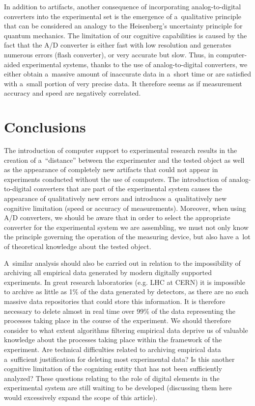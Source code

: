In addition to artifacts, another consequence of incorporating analog-to-digital converters into the experimental set is the emergence of a~qualitative principle that can be considered an analogy to the Heisenberg's uncertainty principle for quantum mechanics. The limitation of our cognitive capabilities is caused by the fact that the A/D converter is either fast with low resolution and generates numerous errors (flash converter), or very accurate but slow. Thus, in computer-aided experimental systems, thanks to the use of analog-to-digital converters, we either obtain a~massive amount of inaccurate data in a~short time or are satisfied with a~small portion of very precise data. It therefore seems as if measurement accuracy and speed are negatively correlated.



\section{Conclusions}

The introduction of computer support to experimental research results in the creation of a~``distance'' between the experimenter and the tested object as well as the appearance of completely new artifacts that could not appear in experiments conducted without the use of computers. The introduction of analog-to-digital converters that are part of the experimental system causes the appearance of qualitatively new errors and introduces a~qualitatively new cognitive limitation (speed or accuracy of measurements). Moreover, when using A/D converters, we should be aware that in order to select the appropriate converter for the experimental system we are assembling, we must not only know the principle governing the operation of the measuring device, but also have a~lot of theoretical knowledge about the tested object.



A~similar analysis should also be carried out in relation to the impossibility of archiving all empirical data generated by modern digitally supported experiments. In great research laboratories (e.g. LHC at CERN) it is impossible to archive as little as 1\% of the data generated by detectors, as there are no such massive data repositories that could store this information. It is therefore necessary to delete almost in real time over 99\% of the data representing the processes taking place in the course of the experiment. We should therefore consider to what extent algorithms filtering empirical data deprive us of valuable knowledge about the processes taking place within the framework of the experiment. Are technical difficulties related to archiving empirical data a~sufficient justification for deleting most experimental data? Is this another cognitive limitation of the cognizing entity that has not been sufficiently analyzed? These questions relating to the role of digital elements in the experimental system are still waiting to be developed (discussing them here would excessively expand the scope of this article).



